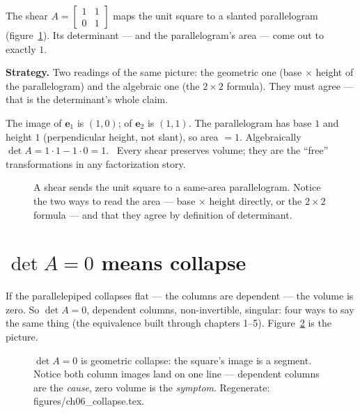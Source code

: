 \begin{example}\label{ex:detshear}
The shear $A=\begin{bmatrix}1&1\\0&1\end{bmatrix}$ maps the unit
square to a slanted parallelogram (figure~\ref{fig:shear}). Its
determinant --- and the parallelogram's area --- come out to exactly
$1$.
\par\smallskip
\textbf{Strategy.} Two readings of the same picture: the geometric
one (base $\times$ height of the parallelogram) and the algebraic one
(the $2\times2$ formula). They must agree --- that is the determinant's
whole claim.
\begin{solution}
The image of $\mathbf e_1$ is $(1,0)$; of $\mathbf e_2$ is $(1,1)$.
The parallelogram has base $1$ and height $1$ (perpendicular height,
not slant), so area $=1$. Algebraically $\det A=1\cdot1-1\cdot0=1$.
\checkmark\ Every shear preserves volume; they are the ``free''
transformations in any factorization story.
\end{solution}
\end{example}

\begin{figure}[htbp]\centering

\caption{A shear sends the unit square to a same-area parallelogram.
Notice the two ways to read the area --- base $\times$ height directly,
or the $2\times2$ formula --- and that they agree by definition of
determinant.}
\label{fig:shear}
\end{figure}

\section{\texorpdfstring{$\det A=0$ means collapse}{det A = 0 means collapse}}\label{sec:det-zero}

If the parallelepiped collapses flat --- the columns are dependent --- the
volume is zero. So $\det A=0$, dependent columns, non-invertible, singular:
four ways to say the same thing (the equivalence built through
chapters 1--5). Figure~\ref{fig:det-collapse} is the picture.

\begin{figure}[htbp]
\centering

\caption{$\det A=0$ is geometric collapse: the square's image is a segment.
Notice both column images land on one line --- dependent columns are the
\emph{cause}, zero volume is the \emph{symptom}. Regenerate:
\ttfamily figures/ch06\_collapse.tex.}
\label{fig:det-collapse}
\end{figure}

